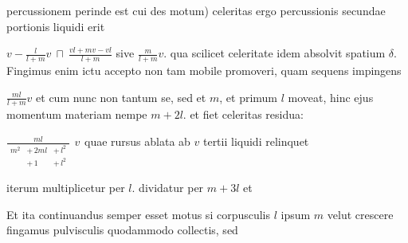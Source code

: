 %
%
percussionem perinde est cui des motum) celeritas ergo percussionis secundae portionis liquidi erit \rule[-4mm]{0mm}{10mm}$\displaystyle v - \frac{l}{l + m} v \ \sqcap \ \frac{vl + mv - vl}{l + m}$ sive $\displaystyle \frac{m}{l + m} v$. qua scilicet celeritate idem absolvit spatium\protect{} $\displaystyle \delta$. Fingimus enim ictu accepto non tam mobile promoveri, quam sequens impingens 
\rule[-4mm]{0mm}{10mm}$\displaystyle \frac{ml}{l + m} v$ et cum nunc non tantum se, sed et $\displaystyle m$, et primum $\displaystyle l$ moveat, hinc ejus momentum 
materiam nempe 
%
%
$\displaystyle m + 2l$. et fiet celeritas residua: \rule[-4mm]{0mm}{10mm}$\displaystyle \frac{ml}{\begin{array}{lll} m^2 & + \, 2ml & + \, l^2\\ & +\, 1 & +\, l^2 \end{array}} \begin{array}{r}\!\!\!v \end{array}$quae rursus ablata ab $\displaystyle v$ tertii liquidi relinquet \rule[-4mm]{0mm}{10mm}
iterum multiplicetur per $\displaystyle l$. dividatur per $\displaystyle m + 3l$
et \rule[-4mm]{0mm}{10mm} Et ita continuandus semper esset motus si corpusculis $\displaystyle l$ ipsum $\displaystyle m$ velut crescere fingamus pulvisculis quodammodo collectis, sed 
